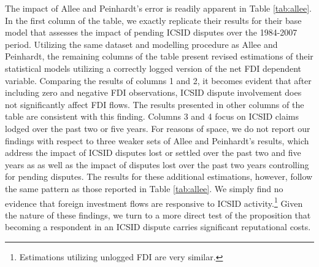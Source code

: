\documentclass[12pt,onesided]{amsart}
\begin{document}
The impact of Allee and Peinhardt's error is readily apparent in Table \ref{tab:allee}. In the first column of the table, we exactly replicate their results for their base model that assesses the impact of pending ICSID disputes over the 1984-2007 period. Utilizing the same dataset and modelling procedure as Allee and Peinhardt, the remaining columns of the table present revised estimations of their statistical models utilizing a correctly logged version of the net FDI dependent variable. Comparing the results of columns 1 and 2, it becomes evident that after including zero and negative FDI observations, ICSID dispute involvement does not significantly affect FDI flows. The results presented in other columns of the table are consistent with this finding. Columns 3 and 4 focus on ICSID claims lodged over the past two or five years. For reasons of space, we do not report our findings with respect to three weaker sets of Allee and Peinhardt's results, which address the impact of ICSID disputes lost or settled over the past two and five years as as well as the impact of disputes lost over the past two years controlling for pending disputes. The results for these additional estimations, however, follow the same pattern as those reported in Table \ref{tab:allee}. We simply find no evidence that foreign investment flows are responsive to ICSID activity.\footnote{Estimations utilizing unlogged FDI are very similar.} Given the nature of these findings, we turn to a more direct test of the proposition that becoming a respondent in an ICSID dispute carries significant reputational costs.

\end{document}
